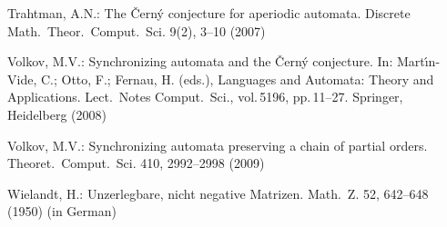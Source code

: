 \documentclass[11pt]{llncs}
\begin{document}
\begin{thebibliography}{99}
Trahtman, A.N.: The \v{C}ern\'y conjecture for aperiodic automata. Discrete
Math.\ Theor.\ Comput.\ Sci. 9(2), 3--10 (2007)

Volkov, M.V.: Synchronizing automata and the \v{C}ern\'{y}
conjecture. In: Mart\'\i{}n-Vide, C.; Otto, F.; Fernau, H. (eds.),
Languages and Automata: Theory and Applications. Lect.\ Notes
Comput.\ Sci., vol.\,5196, pp.\,11--27.  Springer, Heidelberg (2008)

Volkov, M.V.: Synchronizing automata preserving a chain of partial
orders. Theoret.\ Comput.\ Sci. 410, 2992--2998 (2009)

Wielandt, H.: Unzerlegbare, nicht negative Matrizen. Math.\ Z.
52, 642--648 (1950) (in German)
\end{thebibliography}
\end{document}
